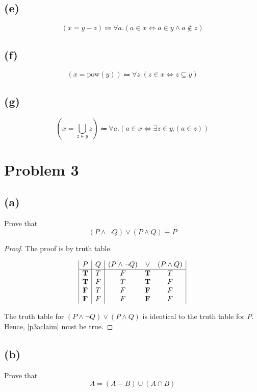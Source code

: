 \documentclass{article}
\begin{document}
\subsection{(e)}
\[
	(x = y - z) \Coloneqq \forall a.(a \in x \iff a \in y \land a \notin z)
\]

\subsection{(f)}
\[
	(x = \text{pow}(y)) \Coloneqq \forall z.(z \in x \iff z \subseteq y)
\]

\subsection{(g)}
\[
	(x = \bigcup_{z \in y} z) \Coloneqq \forall a.(a \in x \iff \exists z \in y.(a \in z))
\]

\pagebreak

\section{Problem 3}
\subsection{(a)}
Prove that
\begin{equation}\label{p3aclaim}
	(P \land \neg Q) \lor (P \land Q) \equiv P
\end{equation}
\begin{proof}
	The proof is by truth table.

	\[
		\begin{array}{|c|c|c c c|}
			P          & Q & (P \land \neg Q) & \lor       & (P \land Q) \\
			\hline
			\mathbf{T} & T & F                & \mathbf{T} & T           \\
			\mathbf{T} & F & T                & \mathbf{T} & F           \\
			\mathbf{F} & T & F                & \mathbf{F} & F           \\
			\mathbf{F} & F & F                & \mathbf{F} & F
		\end{array}
	\]

	The truth table for $(P \land \neg Q) \lor (P \land Q)$ is identical to the truth table for $P$. Hence, \eqref{p3aclaim} must be true.
\end{proof}

\subsection{(b)}
Prove that
\begin{equation}\label{p3bclaim}
	A = (A - B) \cup (A \cap B)
\end{equation}
\end{document}
